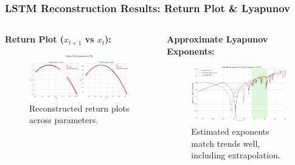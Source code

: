 \documentclass{beamer}
\begin{document}
\begin{frame}
    \frametitle{LSTM Reconstruction Results: Return Plot & Lyapunov}
     \begin{columns}[T]
        \begin{column}{0.5\textwidth}
            \textbf{Return Plot ($x_{t+1}$ vs $x_t$):}
             \begin{figure}
                \includegraphics[width=\linewidth]{figures/lstm_bd_2.png}
                \caption{Reconstructed return plots across parameters.}
                 \label{fig:lstm_bd_2_slide}
            \end{figure}
        \end{column}
        \begin{column}{0.5\textwidth}
            \textbf{Approximate Lyapunov Exponents:}
             \begin{figure}
                \includegraphics[width=\linewidth]{figures/lstm_bd_3.png}
                \caption{Estimated exponents match trends well, including extrapolation.}
                 \label{fig:lstm_bd_3_lyap_slide}
            \end{figure}
        \end{column}
    \end{columns}
\end{frame}
\end{document}
